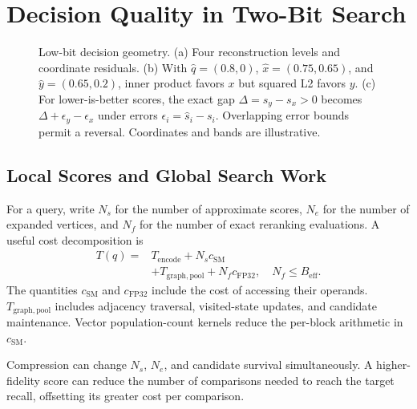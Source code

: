 \section{Decision Quality in Two-Bit Search}
\label{sec:analysis}

\begin{figure}[!t]
\centering
{}
\caption{Low-bit decision geometry. (a) Four reconstruction levels and coordinate residuals. (b) With $\widehat q=(0.8,0)$, $\widehat x=(0.75,0.65)$, and $\widehat y=(0.65,0.2)$, inner product favors $x$ but squared L2 favors $y$. (c) For lower-is-better scores, the exact gap $\Delta=s_y-s_x>0$ becomes $\Delta+\epsilon_y-\epsilon_x$ under errors $\epsilon_i=\widehat s_i-s_i$. Overlapping error bounds permit a reversal. Coordinates and bands are illustrative.}
\label{fig:theory-geometry}
\end{figure}

\subsection{Local Scores and Global Search Work}
For a query, write $N_s$ for the number of approximate scores, $N_e$ for the number of expanded vertices, and $N_f$ for the number of exact reranking evaluations. A useful cost decomposition is
\begin{equation}
\begin{split}
 T(q)={}&T_{\mathrm{encode}}+N_s c_{\mathrm{SM}}\\
       &+T_{\mathrm{graph,pool}}+N_f c_{\mathrm{FP32}},
 \quad N_f\le B_{\mathrm{eff}}.
\end{split}
 \label{eq:cost}
\end{equation}
The quantities $c_{\mathrm{SM}}$ and $c_{\mathrm{FP32}}$ include the cost of accessing their operands. $T_{\mathrm{graph,pool}}$ includes adjacency traversal, visited-state updates, and candidate maintenance. Vector population-count kernels reduce the per-block arithmetic in $c_{\mathrm{SM}}$.

Compression can change $N_s$, $N_e$, and candidate survival simultaneously. A higher-fidelity score can reduce the number of comparisons needed to reach the target recall, offsetting its greater cost per comparison.

